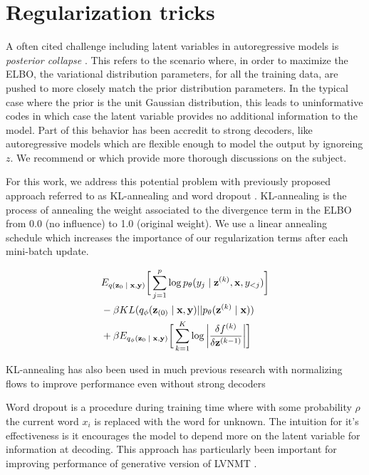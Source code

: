 \section{Regularization tricks}




A often cited challenge including latent variables in autoregressive models is  \textit{posterior collapse} \cite{he2018lagging}. This refers to the scenario where, in order to maximize the ELBO, the variational distribution parameters, for all the training data, are pushed to more closely match the prior distribution parameters. In the typical case where the prior is the unit Gaussian distribution, this leads to uninformative codes in which case the latent variable provides no additional information to the model. Part of this behavior has been accredit to strong decoders, like autoregressive models which are flexible enough to model the output by ignoreing $z$. We recommend \citet{chen2016VariationalLossyAE} or \citet{zhao2017InfoVAE} which provide more thorough discussions on the subject. 
 

For this work, we address this potential problem with previously proposed approach referred to as KL-annealing \cite{bowman2015GeneratingSent,sonderby2016LadderVAE} and word dropout \cite{bowman2015GeneratingSent}. KL-annealing is the process of annealing the weight associated to the divergence term in the ELBO from 0.0 (no influence) to 1.0 (original weight). We use a linear annealing schedule which increases the importance of our regularization terms after each mini-batch update. 

\begin{align}
\begin{split}\label{eq:2}
&
E_{q(\textbf{z}_{0}\; | \;{\textbf{x}, \textbf{y}})} \bigg[ \sum_{j=1}^{p} \log p_{\theta}(y_{j} \; | \;{\textbf{z}^{(k)}}, \textbf{x}, y_{<j}) \bigg] \\
& - \beta KL(q_{\phi}(\textbf{z}_{(0)} \; | \;{\textbf{x}, \textbf{y}}) || p_{\theta}(\textbf{z}^{(k)} \; | \;{\textbf{x}})) \\
&   +  \beta E_{q_{\phi}(\textbf{z}_{0} \; | \;{\textbf{x}, \textbf{y}})} \bigg[\sum_{k=1}^{K} \log \bigg|\frac{\delta f^{(k)}}{\delta \textbf{z}^{(k-1)}} \bigg| \bigg]  
\end{split}
\end{align}

KL-annealing has also been used in much previous research with normalizing flows to improve performance even without strong decoders \cite{rezende2015VIwithNF,kingma2016IAF,tomczak2016Householder,Berg2018SylvesterNF,ziegler2019LatentNFforDiscrete}

Word dropout is a procedure during training time where with some probability $\rho$ the current word $x_{i}$ is replaced with the word for unknown. The intuition for it's effectiveness is it encourages the model to depend more on the latent variable for information at decoding. This approach has particularly been important for improving performance of generative version of \ac{LVNMT} \cite{harshil2018GNMT,eikema2018AEVNMT}.


